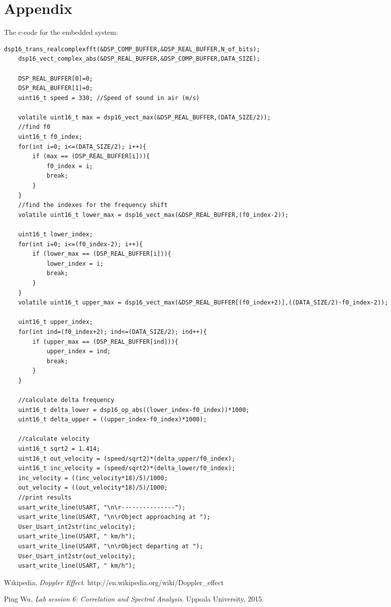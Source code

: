 \documentclass[a4paper,11pt]{article}
\begin{document}
\newpage
\section*{Appendix}

The c-code for the embedded system: \\
\begin{lstlisting}[frame=single]
	dsp16_trans_realcomplexfft(&DSP_COMP_BUFFER,&DSP_REAL_BUFFER,N_of_bits);
	dsp16_vect_complex_abs(&DSP_REAL_BUFFER,&DSP_COMP_BUFFER,DATA_SIZE);
	
	DSP_REAL_BUFFER[0]=0;
	DSP_REAL_BUFFER[1]=0;
	uint16_t speed = 330; //Speed of sound in air (m/s)
	
	volatile uint16_t max = dsp16_vect_max(&DSP_REAL_BUFFER,(DATA_SIZE/2));
	//find f0
	uint16_t f0_index;
	for(int i=0; i<=(DATA_SIZE/2); i++){
		if (max == (DSP_REAL_BUFFER[i])){
			f0_index = i;
			break;
		}
	}
	//find the indexes for the frequency shift
	volatile uint16_t lower_max = dsp16_vect_max(&DSP_REAL_BUFFER,(f0_index-2));

	uint16_t lower_index;
	for(int i=0; i<=(f0_index-2); i++){
		if (lower_max == (DSP_REAL_BUFFER[i])){
			lower_index = i;
			break;
		}
	}
	volatile uint16_t upper_max = dsp16_vect_max(&DSP_REAL_BUFFER[(f0_index+2)],((DATA_SIZE/2)-f0_index-2));

	uint16_t upper_index;
	for(int ind=(f0_index+2); ind<=(DATA_SIZE/2); ind++){
		if (upper_max == (DSP_REAL_BUFFER[ind])){
			upper_index = ind;
			break;
		}
	}
	
	//calculate delta frequency
	uint16_t delta_lower = dsp16_op_abs((lower_index-f0_index))*1000;
	uint16_t delta_upper = ((upper_index-f0_index)*1000);
	
	//calculate velocity
    uint16_t sqrt2 = 1.414;
	uint16_t out_velocity = (speed/sqrt2)*(delta_upper/f0_index);
	uint16_t inc_velocity = (speed/sqrt2)*(delta_lower/f0_index);
	inc_velocity = ((inc_velocity*18)/5)/1000;
	out_velocity = ((out_velocity*18)/5)/1000;
	//print results
	usart_write_line(USART, "\n\r---------------");
	usart_write_line(USART, "\n\rObject approaching at ");
	User_Usart_int2str(inc_velocity);
	usart_write_line(USART, " km/h");
	usart_write_line(USART, "\n\rObject departing at ");
	User_Usart_int2str(out_velocity);
	usart_write_line(USART, " km/h");	
\end{lstlisting}

\begin{thebibliography}{9}

  Wikipedia,
  \emph{Doppler Effect}.
  http://en.wikipedia.org/wiki/Doppler\_effect

  Ping Wu,
  \emph{Lab session 6: Correlation and Spectral Analysis}.
  Uppsala University,
  2015.

\end{thebibliography}
\end{document}
